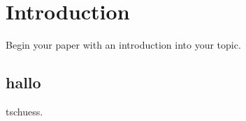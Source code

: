 \section{Introduction}
\label{sec:introduction}
Begin your paper with an introduction into your topic.
\subsection{hallo}
tschuess.
